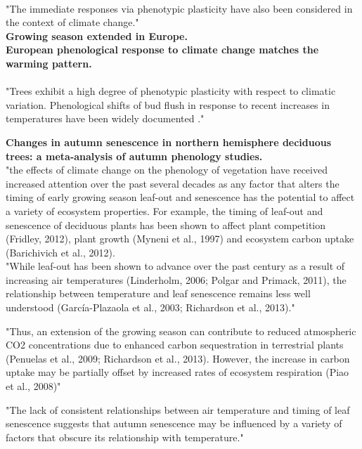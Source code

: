 \documentclass{article}
\begin{document}
\citep{Nicotra10}\\ 
"The immediate responses via phenotypic plasticity have also been considered in the context of climate change." \\

\citep{Menzel99} \textbf{Growing season extended in Europe.}\\
\citep{Menzel06} \textbf{European phenological response to climate change matches the warming pattern.}\\
\citep{Parmesan06}\\
"Trees exhibit a high degree of phenotypic plasticity with respect to climatic variation. Phenological shifts of bud flush in response to recent increases in temperatures have been widely documented ." 


\citep{Gill15} \textbf{Changes in autumn senescence in northern hemisphere deciduous trees: a meta-analysis of autumn phenology studies.} \\
"the effects of climate change on the phenology of vegetation have received increased attention over the past several decades as any factor that alters the timing of early growing season leaf-out and senescence has the potential to affect a variety of ecosystem properties. For example, the timing of leaf-out and senescence of deciduous plants has been shown to affect plant competition (Fridley, 2012), plant growth (Myneni et al., 1997) and ecosystem carbon uptake (Barichivich et al., 2012).\\

"While leaf-out has been shown to advance over the past century as a result of increasing air temperatures (Linderholm, 2006; Polgar and Primack, 2011), the relationship between temperature and leaf senescence remains less well understood (García-Plazaola et al., 2003; Richardson et al., 2013)."

"Thus, an extension of the growing season can contribute to reduced atmospheric CO2 concentrations due to enhanced carbon sequestration in terrestrial plants (Penuelas et al., 2009; Richardson et al., 2013). However, the increase in carbon uptake may be partially offset by increased rates of ecosystem respiration (Piao et al., 2008)"

"The lack of consistent relationships between air temperature and timing of leaf senescence suggests that autumn senescence may be influenced by a variety of factors that obscure its relationship with temperature."
\end{document}
